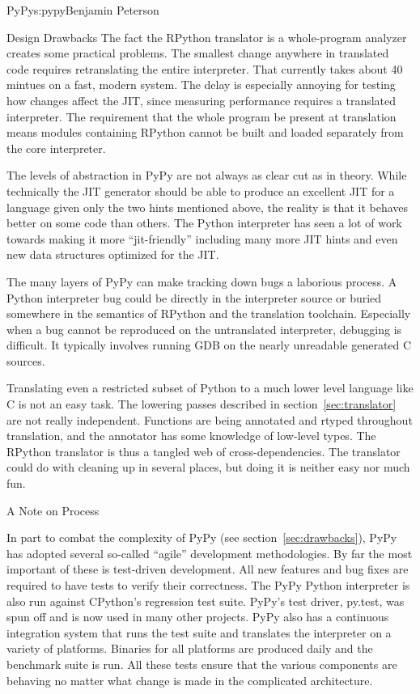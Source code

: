 \begin{aosachapter}{PyPy}{s:pypy}{Benjamin Peterson}
\begin{aosasect1}{Design Drawbacks}
The fact the RPython translator is a whole-program analyzer creates some
practical problems. The smallest change anywhere in translated code requires
retranslating the entire interpreter. That currently takes about 40 mintues on a
fast, modern system. The delay is especially annoying for testing how changes
affect the JIT, since measuring performance requires a translated
interpreter. The requirement that the whole program be present at translation
means modules containing RPython cannot be built and loaded separately from the
core interpreter.

The levels of abstraction in PyPy are not always as clear cut as in
theory. While technically the JIT generator should be able to produce an
excellent JIT for a language given only the two hints mentioned above, the
reality is that it behaves better on some code than others. The Python
interpreter has seen a lot of work towards making it more ``jit-friendly''
including many more JIT hints and even new data structures optimized for the
JIT.

The many layers of PyPy can make tracking down bugs a laborious process. A
Python interpreter bug could be directly in the interpreter source or buried
somewhere in the semantics of RPython and the translation toolchain. Especially
when a bug cannot be reproduced on the untranslated interpreter, debugging is
difficult. It typically involves running GDB on the nearly unreadable generated
C sources.

Translating even a restricted subset of Python to a much lower level language
like C is not an easy task. The lowering passes described in
section~\ref{sec:translator} are not really independent. Functions are being
annotated and rtyped throughout translation, and the annotator has some
knowledge of low-level types. The RPython translator is thus a tangled web of
cross-dependencies. The translator could do with cleaning up in several places,
but doing it is neither easy nor much fun.

\end{aosasect1}

\begin{aosasect1}{A Note on Process}

In part to combat the complexity of PyPy (see section~\ref{sec:drawbacks}), PyPy
has adopted several so-called ``agile'' development methodologies. By far the
most important of these is test-driven development. All new features and bug
fixes are required to have tests to verify their correctness. The PyPy Python
interpreter is also run against CPython's regression test suite. PyPy's test
driver, py.test, was spun off and is now used in many other projects. PyPy also
has a continuous integration system that runs the test suite and translates the
interpreter on a variety of platforms. Binaries for all platforms are produced
daily and the benchmark suite is run. All these tests ensure that the various
components are behaving no matter what change is made in the complicated
architecture.


\end{aosasect1}
\end{aosachapter}
